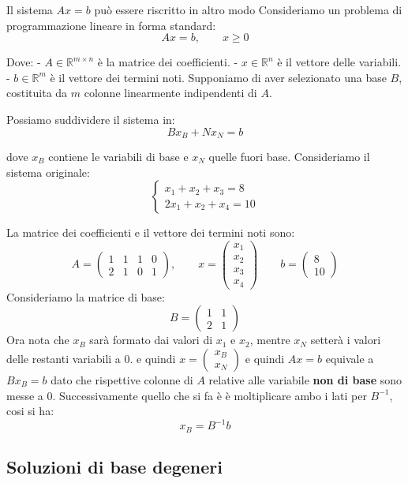 \begin{observation}{Il sistema $Ax = b$ può essere riscritto in altro modo}
Consideriamo un problema di programmazione lineare in forma standard:
\[
Ax=b,\qquad x\geq 0
\]

Dove:
- \(A\in\mathbb{R}^{m\times n}\) è la matrice dei coefficienti.
- \(x\in\mathbb{R}^n\) è il vettore delle variabili.
- \(b\in\mathbb{R}^m\) è il vettore dei termini noti.
Supponiamo di aver selezionato una base \(B\), costituita da \(m\) colonne linearmente indipendenti di \(A\).

Possiamo suddividere il sistema in:
\[
\boxed{Bx_B+Nx_N=b}
\]

dove \(x_B\) contiene le variabili di base e \(x_N\) quelle fuori base.
Consideriamo il sistema originale:
\[
\begin{cases}
x_1+x_2+x_3=8\\
2x_1+x_2+x_4=10
\end{cases}
\]

La matrice dei coefficienti e il vettore dei termini noti sono:
\[
A=
\begin{pmatrix}
1&1&1&0\\
2&1&0&1
\end{pmatrix},
\qquad
x = \begin{pmatrix} x_1 \\ x_2 \\ x_3 \\ x_4\end{pmatrix}
\qquad
b=
\begin{pmatrix}
8\\10
\end{pmatrix}
\]
Consideriamo la matrice di base:
\[
B=
\begin{pmatrix}
1&1\\
2&1
\end{pmatrix}
\]
Ora nota che $x_B$ sarà formato dai valori di $x_1$ e $x_2$, mentre $x_N$ setterà i valori delle restanti variabili a 0.
e quindi $x = \begin{pmatrix}
    x_B \\ x_N
\end{pmatrix}$
e quindi $Ax = b$ equivale a $B x_B = b$ dato che rispettive colonne di $A$ relative alle variabile \textbf{non di base} sono messe a 0.
Successivamente quello che si fa è è moltiplicare ambo i lati per $B^{-1}$, cosi si ha:
\[
x_B = B^{-1} b
\]
\end{observation}

\subsection{Soluzioni di base degeneri}

